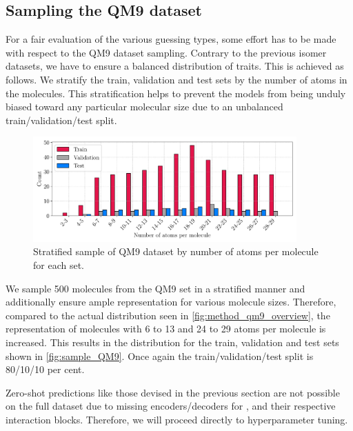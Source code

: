 \subsection{Sampling the QM9 dataset}
\label{sec:qm9_full_isomers_sampling}
For a fair evaluation of the various guessing types, some effort has to be made with respect to the QM9 dataset sampling. Contrary to the previous isomer datasets, we have to ensure a balanced distribution of traits. This is achieved as follows. We stratify the train, validation and test sets by the number of atoms in the molecules. This stratification helps to prevent the models from being unduly biased toward any particular molecular size due to an unbalanced train/validation/test split.
\begin{figure}[H]
    \centering
    \includegraphics[width=0.9\textwidth]{../fig/application/strat_sample.pdf}
    \caption[Stratified sample of QM9 dataset]{Stratified sample of QM9 dataset by number of atoms per molecule for each set.}
    \label{fig:sample_QM9}
\end{figure}
We sample 500 molecules from the QM9 set in a stratified manner and additionally ensure ample representation for various molecule sizes. Therefore, compared to the actual distribution seen in \autoref{fig:method_qm9_overview}, the representation of molecules with 6 to 13 and 24 to 29 atoms per molecule is increased. This results in the distribution for the train, validation and test sets shown in \autoref{fig:sample_QM9}. Once again the train/validation/test split is 80/10/10 per cent. %

Zero-shot predictions like those devised in the previous section are not possible on the full dataset due to missing encoders/decoders for ,  and their respective interaction blocks. Therefore, we will proceed directly to hyperparameter tuning. 
